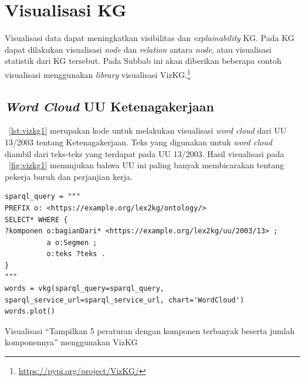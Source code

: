 \section{Visualisasi KG}
\label{sec:visualisasi-kg}

Visualisasi data dapat meningkatkan visibilitas dan \textit{explainability} KG. Pada KG dapat
dilakukan visualisasi \textit{node} dan \textit{relation} antara \textit{node}, atau visualisasi
statistik dari KG tersebut. Pada Subbab ini akan diberikan beberapa contoh visualisasi menggunakan
\textit{library} visualisasi VizKG.\footnote{\url{https://pypi.org/project/VizKG/}}

\subsection{\textit{Word Cloud} UU Ketenagakerjaan}
\label{subsec:word-cloud}

\lst~\ref{lst:vizkg1} merupakan kode untuk melakukan visualisasi \textit{word cloud} dari UU 13/2003
tentang Ketenagakerjaan. Teks yang digunakan untuk \textit{word cloud} diambil dari teks-teks yang
terdapat pada UU 13/2003. Hasil visualisasi pada \pic~\ref{fig:vizkg1} menunjukan bahwa UU ini
paling banyak membicarakan tentang pekerja buruh dan perjanjian kerja.

\begin{listing}[H]
  \begin{verbatim}
sparql_query = """
PREFIX o: <https://example.org/lex2kg/ontology/>
SELECT* WHERE { 
?komponen o:bagianDari* <https://example.org/lex2kg/uu/2003/13> ;
          a o:Segmen ;
          o:teks ?teks .
}
"""
words = vkg(sparql_query=sparql_query, sparql_service_url=sparql_service_url, chart='WordCloud')
words.plot()
  \end{verbatim}
  \caption{Visualisasi ``Tampilkan 5 peraturan dengan komponen terbanyak beserta jumlah komponennya'' menggunakan VizKG}
  \label{lst:vizkg1}
\end{listing}


